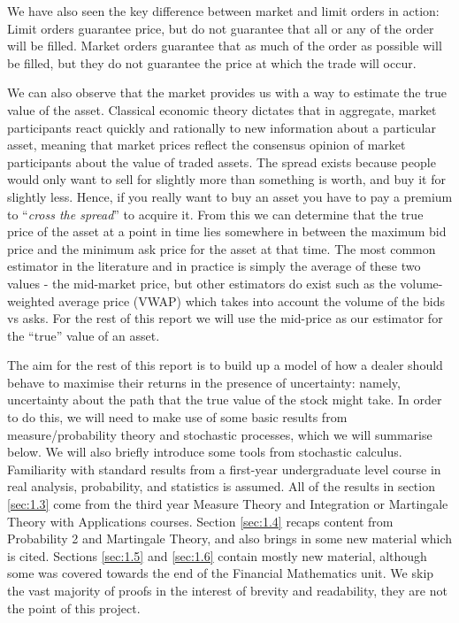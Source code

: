 We have also seen the key difference between market and limit orders in action: Limit 
orders guarantee price, but do not guarantee that all or any of the order will be 
filled. Market orders guarantee that as much of the order as possible will be filled, 
but they do not guarantee the price at which the trade will occur.

We can also observe that the market provides us with a way to estimate the true value 
of the asset. Classical economic theory dictates that in aggregate, market participants 
react quickly and rationally to new information about a particular asset, meaning that 
market prices reflect the consensus opinion of market participants about the value of 
traded assets. The spread exists because people would only want to sell for slightly 
more than something is worth, and buy it for slightly less. Hence, if you really want 
to buy an asset you have to pay a premium to ``\textit{cross the spread}'' to acquire 
it. From this we can determine that the true price of the asset at a point in time 
lies somewhere in between the maximum bid price and the minimum ask price for the asset 
at that time. The most common estimator in the literature and in practice is simply 
the average of these two values - the mid-market price, but other estimators do exist 
such as the volume-weighted average price (VWAP) which takes into account the volume 
of the bids vs asks. For the rest of this report we will use the mid-price as our 
estimator for the ``true'' value of an asset.

The aim for the rest of this report is to build up a model of how a dealer should 
behave to maximise their returns in the presence of uncertainty: namely, uncertainty 
about the path that the true value of the stock might take. In order to do this, we 
will need to make use of some basic results from measure/probability theory and 
stochastic processes, which we will summarise below. We will also briefly introduce 
some tools from stochastic calculus. Familiarity with standard results from a 
first-year undergraduate level course in real analysis, probability, and statistics 
is assumed. All of the results in section \ref{sec:1.3} come from the third year
Measure Theory and Integration or Martingale Theory with Applications courses. Section
\ref{sec:1.4} recaps content from Probability 2 and Martingale Theory, and also brings
in some new material which is cited. Sections \ref{sec:1.5} and \ref{sec:1.6} contain 
mostly new material, although some was covered towards the end of the Financial 
Mathematics unit. We skip the vast majority of proofs in the interest of brevity 
and readability, they are not the point of this project. 

